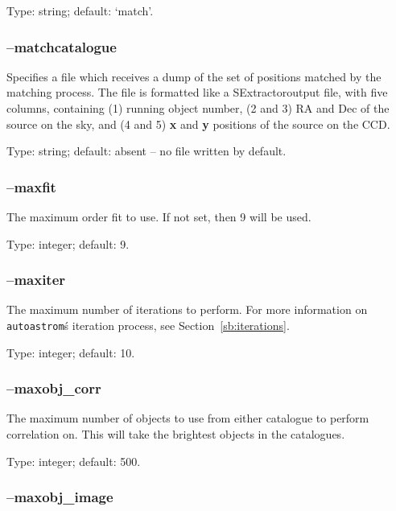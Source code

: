 \documentclass[twoside,11pt]{article}
\newcommand{\xref}[3]{#1}
\newcommand{\xlabel}[1]{}
\newcommand{\autoastrom}{\texttt{autoastrom}}
\newcommand{\SExtractor}{\xref{{\footnotesize SExtractor}}{sun226}}
\begin{document}
Type: string; default: `match'.

\subsubsection{\xlabel{sb_options_matchcatalogue}--matchcatalogue\label{sb:options:matchcatalogue}}

Specifies a file which receives a dump of the set of positions matched by the
matching process.  The file is formatted like a \SExtractor\ output file, with
five columns, containing (1) running object number, (2 and 3) RA and Dec of
the source on the sky, and (4 and 5) \textbf{x} and \textbf{y} positions of
the source on the CCD.

Type: string; default: absent -- no file written by default.

\subsubsection{\xlabel{sb_options_maxfig}--maxfit\label{sb:options:maxfit}}

The maximum order fit to use. If not set, then 9 will be used.

Type: integer; default: 9.

\subsubsection{\xlabel{sb_options_maxiter}--maxiter\label{sb:options:maxiter}}

The maximum number of iterations to perform. For more information on
\autoastrom\'s iteration process, see Section~\ref{sb:iterations}.

Type: integer; default: 10.

\subsubsection{\xlabel{sb_options_maxobj_corr}--maxobj\_corr\label{sb:options:maxobj_corr}}

The maximum number of objects to use from either catalogue to perform
correlation on. This will take the brightest objects in the catalogues.

Type: integer; default: 500.

\subsubsection{\xlabel{sb_options_maxobj_image}--maxobj\_image\label{sb:options:maxobj_image}}
\end{document}
